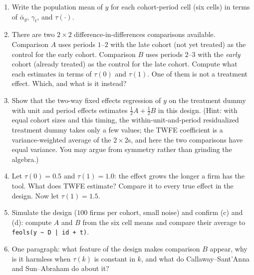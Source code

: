 \documentclass[11pt]{article}
\begin{document}
\begin{enumerate}[label=(\alph*)]
\item Write the population mean of $y$ for each cohort-period cell (six cells) in terms of
$\bar\alpha_{g}$, $\gamma_{t}$, and $\tau(\cdot)$.
\item There are two $2\times 2$ difference-in-differences comparisons available. Comparison $A$ uses
periods $1$--$2$ with the late cohort (not yet treated) as the control for the early cohort.
Comparison $B$ uses periods $2$--$3$ with the \emph{early} cohort (already treated) as the control
for the late cohort. Compute what each estimates in terms of $\tau(0)$ and $\tau(1)$. One of them
is not a treatment effect. Which, and what is it instead?
\item Show that the two-way fixed effects regression of $y$ on the treatment dummy with unit and
period effects estimates $\tfrac{1}{2}A + \tfrac{1}{2}B$ in this design. (Hint: with equal cohort
sizes and this timing, the within-unit-and-period residualized treatment dummy takes only a few
values; the TWFE coefficient is a variance-weighted average of the $2\times 2$s, and here the two
comparisons have equal variance. You may argue from symmetry rather than grinding the algebra.)
\item Let $\tau(0) = 0.5$ and $\tau(1) = 1.0$: the effect grows the longer a firm has the tool.
What does TWFE estimate? Compare it to every true effect in the design. Now let $\tau(1) = 1.5$.
\item Simulate the design ($100$ firms per cohort, small noise) and confirm (c) and (d): compute
$A$ and $B$ from the six cell means and compare their average to \texttt{feols(y \~{} D | id + t)}.
\item One paragraph: what feature of the design makes comparison $B$ appear, why is it harmless
when $\tau(k)$ is constant in $k$, and what do Callaway--Sant'Anna and Sun--Abraham do about it?
\end{enumerate}
\end{document}
